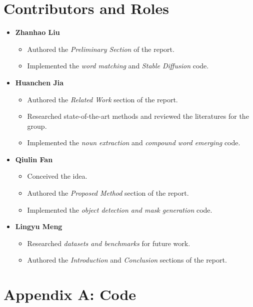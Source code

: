\documentclass[11pt,letterpaper]{article}
\begin{document}
\section{Contributors and Roles}
\begin{itemize}
    \item \textbf{Zhanhao Liu} 
    \begin{itemize}
        \item Authored the \emph{Preliminary Section} of the report.
        \item Implemented the \emph{word matching} and \emph{Stable Diffusion} code.
    \end{itemize}
    \item \textbf{Huanchen Jia} 
    \begin{itemize}
        \item Authored the \emph{Related Work} section of the report.
        \item Researched state-of-the-art methods and reviewed the literatures for the group.
        \item Implemented the \emph{noun extraction} and \emph{compound word emerging} code.
    \end{itemize}
    \item \textbf{Qiulin Fan} 
    \begin{itemize}
        \item Conceived the idea.
        \item Authored the \emph{Proposed Method} section of the report.
        \item Implemented the \emph{object detection and mask generation} code.
    \end{itemize}
    \item \textbf{Lingyu Meng} 
    \begin{itemize}
        \item Researched \emph{datasets and benchmarks} for future work.
        \item Authored the \emph{Introduction} and \emph{Conclusion} sections of the report.
    \end{itemize}
\end{itemize}

\printbibliography


\appendix
\section*{Appendix A: Code}
\end{document}
